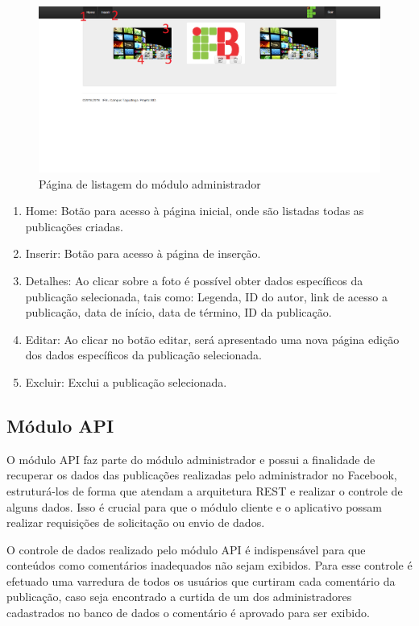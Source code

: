 \begin{figure}[H]
\centering
\includegraphics[width=\textwidth]{figuras/administrador2}
\caption{Página de listagem  do módulo administrador}
\label{fig:administrador2}
\end{figure}

\begin{enumerate}
   \item Home: Botão para acesso à página inicial, onde são listadas todas as publicações criadas.
   \item Inserir: Botão para acesso à página de inserção.
   \item Detalhes: Ao clicar sobre a foto é possível obter dados específicos da publicação selecionada, tais como: Legenda, ID do autor, link de acesso a publicação, data de início, data de término, ID da publicação.
   \item Editar: Ao clicar no botão editar, será apresentado uma nova página edição dos dados específicos da publicação selecionada.
   \item Excluir: Exclui a publicação selecionada.
 \end{enumerate}

\subsection{Módulo API}
\label{sub:api}
O módulo API faz parte do módulo administrador e possui a finalidade de recuperar os dados das publicações realizadas pelo administrador no Facebook, estruturá-los de forma que atendam a arquitetura REST e realizar o controle de alguns dados. Isso é crucial para que o módulo cliente e o aplicativo possam realizar requisições de solicitação ou envio de dados.

O controle de dados realizado pelo módulo API é indispensável para que conteúdos como comentários inadequados não sejam exibidos. Para esse controle é efetuado uma varredura de todos os usuários que curtiram cada comentário da publicação, caso seja encontrado a curtida de um dos administradores cadastrados no banco de dados o comentário é aprovado para ser exibido.

